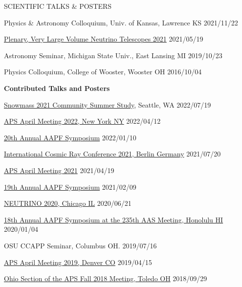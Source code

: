 \documentclass{resume} %
\begin{document}
\begin{rSection}{SCIENTIFIC TALKS \& POSTERS}
\begin{etaremune}
\item Physics \& Astronomy Colloquium, Univ. of Kansas, Lawrence KS \hfill 2021/11/22

\item \href{https://indico.ific.uv.es/event/3965/contributions/14963/}{Plenary, Very Large Volume Neutrino Telescopes 2021} \hfill 2021/05/19

\item Astronomy Seminar, Michigan State Univ., East Lansing MI \hfill 2019/10/23

\item Physics Colloquium, College of Wooster, Wooster OH \hfill 2016/10/04

\end{etaremune}

{\bf Contributed Talks and Posters}
\begin{etaremune}
\item \href{https://indico.fnal.gov/event/22303/contributions/245833/}{Snowmass 2021 Community Summer Study}, Seattle, WA  \hfill 2022/07/19
\item \href{https://meetings.aps.org/Meeting/APR22/Session/Y09.1}{APS April Meeting 2022, New York NY} \hfill 2022/04/12
\item \href{https://aapf-fellows.org/symposium/2022}{20th Annual AAPF Symposium} \hfill 2022/01/10
\item \href{https://indico.desy.de/event/27991/contributions/102162/}{International Cosmic Ray Conference 2021, Berlin Germany} \hfill 2021/07/20
\item \href{http://meetings.aps.org/Meeting/APR21/Session/T18}{APS April Meeting 2021} \hfill 2021/04/19
\item \href{https://sites.google.com/view/aapf2021/schedule}{19th Annual AAPF Symposium} \hfill 2021/02/09
\item \href{https://indico.fnal.gov/event/19348/contributions/186681/}{NEUTRINO 2020, Chicago IL} \hfill 2020/06/21
\item \href{https://aapf-fellows.org/symposium/2020#BrianClark}{18th Annual AAPF Symposium at the 235th AAS Meeting, Honolulu HI} \hfill 2020/01/04
\item OSU CCAPP Seminar, Columbus OH. \hfill 2019/07/16
\item \href{http://meetings.aps.org/Meeting/APR19/Session/R08.4}{APS April Meeting 2019, Denver CO} \hfill 2019/04/15
\item \href{http://meetings.aps.org/Meeting/OSF18/Session/A01.2}{Ohio Section of the APS Fall 2018 Meeting, Toledo OH} \hfill 2018/09/29

\end{etaremune}
\end{rSection}
\end{document}
